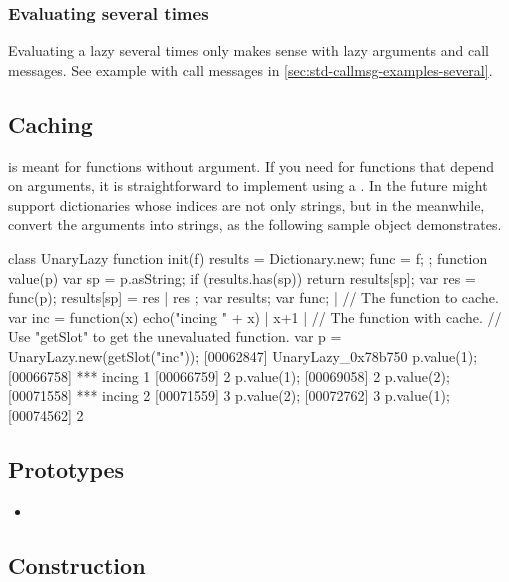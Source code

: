 \subsubsection{Evaluating several times}

Evaluating a lazy several times only makes sense with lazy arguments
and call messages. See example with call messages in
\autoref{sec:std-callmsg-examples-several}.


\subsection{Caching}

 is meant for functions without argument.  If you need
 for functions that depend on arguments, it is
straightforward to implement using a .  In the
future \us might support dictionaries whose indices are not only
strings, but in the meanwhile, convert the arguments into
strings, as the following sample object demonstrates.

\begin{urbiscript}[firstnumber=last]
class UnaryLazy
{
  function init(f)
  {
    results = Dictionary.new;
    func = f;
  };
  function value(p)
  {
    var sp = p.asString;
    if (results.has(sp))
      return results[sp];
    var res = func(p);
    results[sp] = res |
    res
  };
  var results;
  var func;
} |
// The function to cache.
var inc = function(x) { echo("incing " + x) | x+1 } |
// The function with cache.
// Use "getSlot" to get the unevaluated function.
var p = UnaryLazy.new(getSlot("inc"));
[00062847] UnaryLazy_0x78b750
p.value(1);
[00066758] *** incing 1
[00066759] 2
p.value(1);
[00069058] 2
p.value(2);
[00071558] *** incing 2
[00071559] 3
p.value(2);
[00072762] 3
p.value(1);
[00074562] 2
\end{urbiscript}

\subsection{Prototypes}

\begin{itemize}
\item {}
\end{itemize}

\subsection{Construction}

